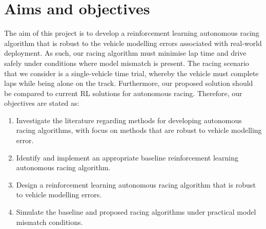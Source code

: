 \section{Aims and objectives}\label{sec:objectives}

The aim of this project is to develop a reinforcement learning autonomous racing algorithm that is robust to the vehicle modelling errors associated with real-world deployment.
As such, our racing algorithm must minimise lap time and drive safely under conditions where model mismatch is present.
The racing scenario that we consider is a single-vehicle time trial, whereby the vehicle must complete laps while being alone on the track.
Furthermore, our proposed solution should be compared to current RL solutions for autonomous racing.
Therefore, our objectives are stated as:
\begin{enumerate}
    \item Investigate the literature regarding methods for developing autonomous racing algorithms, with focus on methods that are robust to vehicle modelling error.
    \item Identify and implement an appropriate baseline reinforcement learning autonomous racing algorithm.
    \item Design a reinforcement learning autonomous racing algorithm that is robust to vehicle modelling errors.
    \item Simulate the baseline and proposed racing algorithms under practical model mismatch conditions.
\end{enumerate}




